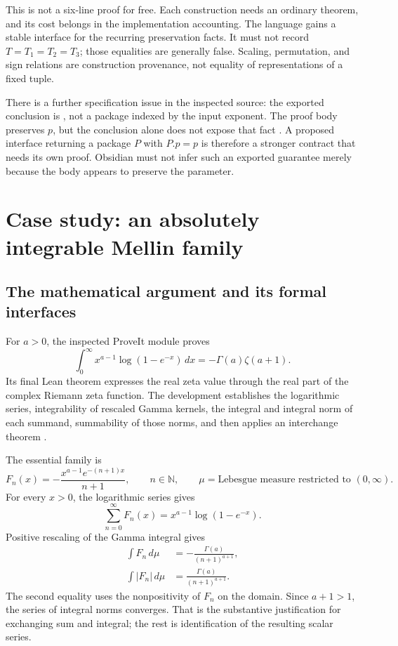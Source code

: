\documentclass[11pt,a4paper]{article}
\newcommand{\code}[1]{\texttt{\detokenize{#1}}}
\newcommand{\N}{\mathbb N}\newcommand{\Z}{\mathbb Z}
\theoremstyle{plain}\newtheorem{proposition}{Proposition}[section]
\theoremstyle{definition}\newtheorem{definition}[proposition]{Definition}
\theoremstyle{remark}\newtheorem{remark}[proposition]{Remark}
\begin{document}
This is not a six-line proof for free. Each construction needs an ordinary theorem, and its cost belongs in the implementation accounting. The language gains a stable interface for the recurring preservation facts. It must not record \(T=T_1=T_2=T_3\); those equalities are generally false. Scaling, permutation, and sign relations are construction provenance, not equality of representations of a fixed tuple.

There is a further specification issue in the inspected source: the exported conclusion is \code{Nonempty FreyPackage}, not a package indexed by the input exponent. The proof body preserves \(p\), but the conclusion alone does not expose that fact \cite{freynorm}. A proposed interface returning a package \(P\) with \(P.p=p\) is therefore a stronger contract that needs its own proof. Obsidian must not infer such an exported guarantee merely because the body appears to preserve the parameter.

\section{Case study: an absolutely integrable Mellin family}\label{sec:mellin}
\subsection{The mathematical argument and its formal interfaces}
For \(a>0\), the inspected ProveIt module proves
\begin{equation}\label{eq:mellin}
 \int_0^\infty x^{a-1}\log(1-e^{-x})\,dx
 =-\Gamma(a)\zeta(a+1).
\end{equation}
Its final Lean theorem expresses the real zeta value through the real part of the complex Riemann zeta function. The development establishes the logarithmic series, integrability of rescaled Gamma kernels, the integral and integral norm of each summand, summability of those norms, and then applies an interchange theorem \cite{mellin}.

The essential family is
\[
 F_n(x)=-\frac{x^{a-1}e^{-(n+1)x}}{n+1},\qquad n\in\N,
 \qquad \mu=\text{Lebesgue measure restricted to }(0,\infty).
\]
For every \(x>0\), the logarithmic series gives
\[
 \sum_{n=0}^\infty F_n(x)=x^{a-1}\log(1-e^{-x}).
\]
Positive rescaling of the Gamma integral gives
\begin{align*}
 \int F_n\,d\mu&=-\frac{\Gamma(a)}{(n+1)^{a+1}},\\
 \int |F_n|\,d\mu&=\frac{\Gamma(a)}{(n+1)^{a+1}}.
\end{align*}
The second equality uses the nonpositivity of \(F_n\) on the domain. Since \(a+1>1\), the series of integral norms converges. That is the substantive justification for exchanging sum and integral; the rest is identification of the resulting scalar series.
\end{document}
